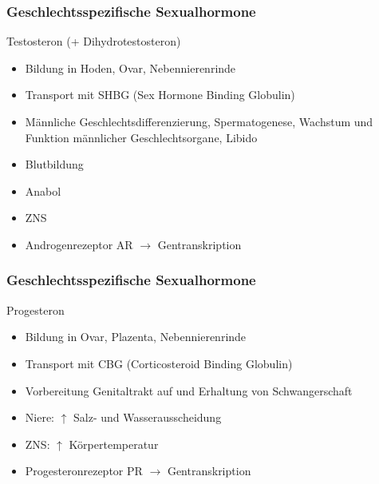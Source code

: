 \documentclass{beamer}
\begin{document}
\begin{frame}
 \frametitle{Geschlechtsspezifische Sexualhormone}



\begin{block}{Testosteron (+ Dihydrotestosteron)}
\begin{itemize}
\item
Bildung in Hoden, Ovar, Nebennierenrinde
\item
Transport mit SHBG (Sex Hormone Binding Globulin)
\item
 Männliche Geschlechtsdifferenzierung, Spermatogenese, Wachstum und Funktion männlicher Geschlechtsorgane, Libido
\item
Blutbildung
\item
Anabol
\item
ZNS
\item
 Androgenrezeptor AR \(\rightarrow\) Gentranskription
\end{itemize}
\end{block}
\end{frame}

\begin{frame}
\frametitle{Geschlechtsspezifische Sexualhormone}

\begin{block}{Progesteron}
\begin{itemize}
\item
Bildung in Ovar, Plazenta, Nebennierenrinde
\item
Transport mit CBG (Corticosteroid Binding Globulin)
\item
Vorbereitung Genitaltrakt auf und Erhaltung von Schwangerschaft
\item
Niere: \(\uparrow\) Salz- und Wasserausscheidung
\item
ZNS: \(\uparrow\) Körpertemperatur
\item
Progesteronrezeptor PR \(\rightarrow\) Gentranskription
\end{itemize}
\end{block}

\end{frame}

        
\end{document}
